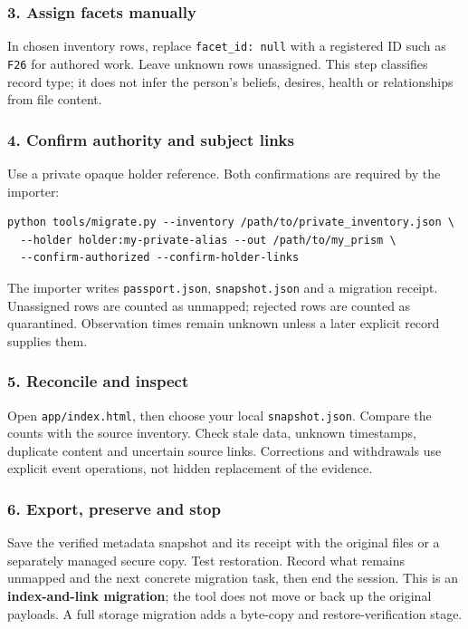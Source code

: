 \documentclass[11pt,a4paper]{article}
\begin{document}
\subsubsection{3. Assign facets manually}
In chosen inventory rows, replace \texttt{facet\_id: null} with a registered ID such as \texttt{F26} for authored work. Leave unknown rows unassigned. This step classifies record type; it does not infer the person's beliefs, desires, health or relationships from file content.

\subsubsection{4. Confirm authority and subject links}
Use a private opaque holder reference. Both confirmations are required by the importer:
\begin{lstlisting}
python tools/migrate.py --inventory /path/to/private_inventory.json \
  --holder holder:my-private-alias --out /path/to/my_prism \
  --confirm-authorized --confirm-holder-links
\end{lstlisting}
The importer writes \texttt{passport.json}, \texttt{snapshot.json} and a migration receipt. Unassigned rows are counted as unmapped; rejected rows are counted as quarantined. Observation times remain unknown unless a later explicit record supplies them.

\subsubsection{5. Reconcile and inspect}
Open \texttt{app/index.html}, then choose your local \texttt{snapshot.json}. Compare the counts with the source inventory. Check stale data, unknown timestamps, duplicate content and uncertain source links. Corrections and withdrawals use explicit event operations, not hidden replacement of the evidence.

\subsubsection{6. Export, preserve and stop}
Save the verified metadata snapshot and its receipt with the original files or a separately managed secure copy. Test restoration. Record what remains unmapped and the next concrete migration task, then end the session. This is an \textbf{index-and-link migration}; the tool does not move or back up the original payloads. A full storage migration adds a byte-copy and restore-verification stage.
\end{document}
